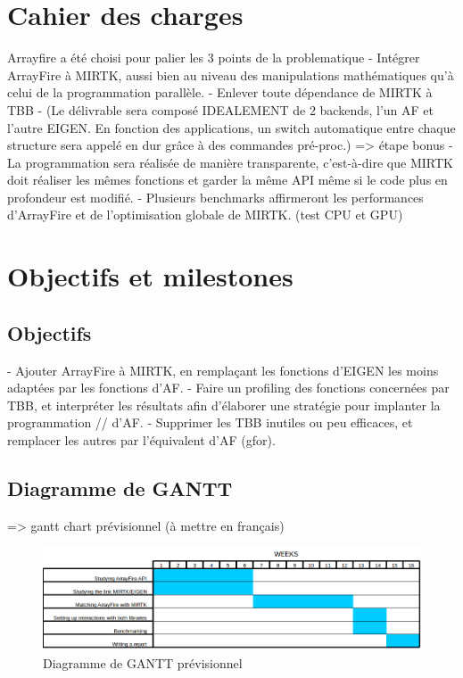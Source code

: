 \documentclass[10pt]{report}
\begin{document}
	 

	\section{Cahier des charges}
	Arrayfire a été choisi pour palier les 3 points de la problematique \newline
	- Intégrer ArrayFire à MIRTK, aussi bien au niveau des manipulations mathématiques qu'à celui de la programmation parallèle.
	\newline- Enlever toute dépendance de MIRTK à TBB
	\newline- (Le délivrable sera composé IDEALEMENT de 2 backends, l'un AF et l'autre EIGEN. En fonction des applications, un switch automatique entre chaque structure sera appelé en dur grâce à des commandes pré-proc.) => étape bonus
	\newline- La programmation sera réalisée de manière transparente, c'est-à-dire que MIRTK doit réaliser les mêmes fonctions et garder la même API même si le code plus en profondeur est modifié.
	\newline- Plusieurs benchmarks affirmeront les performances d'ArrayFire et de l'optimisation globale de MIRTK. (test CPU et GPU)
	
	\section{Objectifs et milestones}
	
	\subsection{Objectifs} 
	- Ajouter ArrayFire à MIRTK, en remplaçant les fonctions d'EIGEN les moins adaptées par les fonctions d'AF. \newline
	- Faire un profiling des fonctions concernées par TBB, et interpréter les résultats afin d'élaborer une stratégie pour implanter la programmation // d'AF.\newline
	- Supprimer les TBB inutiles ou peu efficaces, et remplacer les autres par l'équivalent d'AF (gfor).\newline
	
	\vspace{5cm}
	\subsection{Diagramme de GANTT}
	 => gantt chart prévisionnel (à mettre en français)
	\begin{figure}[h!]
		\begin{center}
			\includegraphics[width=18cm]{Reports/figures/estimated_gantt.png}
		\end{center}	
		\caption{Diagramme de GANTT prévisionnel}
		\label{Diagramme de GANTT prévisionnel}
	\end{figure}
\end{document}
